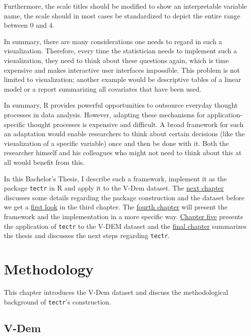 \documentclass[]{report}
\theoremstyle{definition}
\theoremstyle{definition}
\theoremstyle{definition}
\theoremstyle{remark}
\begin{document}
Furthermore, the scale titles should be modified to show an
interpretable variable name, the scale should in most cases be
standardized to depict the entire range between 0 and 4.

In summary, there are many considerations one needs to regard in such a
visualization. Therefore, every time the statistician needs to implement
such a visualization, they need to think about these questions again,
which is time expensive and makes interactive user interfaces
impossible. This problem is not limited to visualization; another
example would be descriptive tables of a linear model or a report
summarizing all covariates that have been used.

In summary, R provides powerful opportunities to outsource everyday
thought processes in data analysis. However, adapting these mechanisms
for application-specific thought processes is expensive and difficult. A
broad framework for such an adaptation would enable researchers to think
about certain decisions (like the visualization of a specific variable)
once and then be done with it. Both the researcher himself and his
colleagues who might not need to think about this at all would benefit
from this.

In this Bachelor's Thesis, I describe such a framework, implement it as
the package \texttt{tectr} in R and apply it to the V-Dem dataset. The
\protect\hyperlink{methods}{next chapter} discusses some details
regarding the package construction and the dataset before we get a
\protect\hyperlink{example}{first look} in the third chapter. The
\protect\hyperlink{concept}{fourth chapter} will present the framework
and the implementation in a more specific way.
\protect\hyperlink{application}{Chapter five} presents the application
of \texttt{tectr} to the V-DEM dataset and the
\protect\hyperlink{summary}{final chapter} summarizes the thesis and
discusses the next steps regarding \texttt{tectr}.

\hypertarget{methods}{\chapter{Methodology}\label{methods}}

This chapter introduces the V-Dem dataset and discuss the methodological
background of \texttt{tectr}'s construction.

\section{V-Dem}\label{v-dem}
\end{document}
